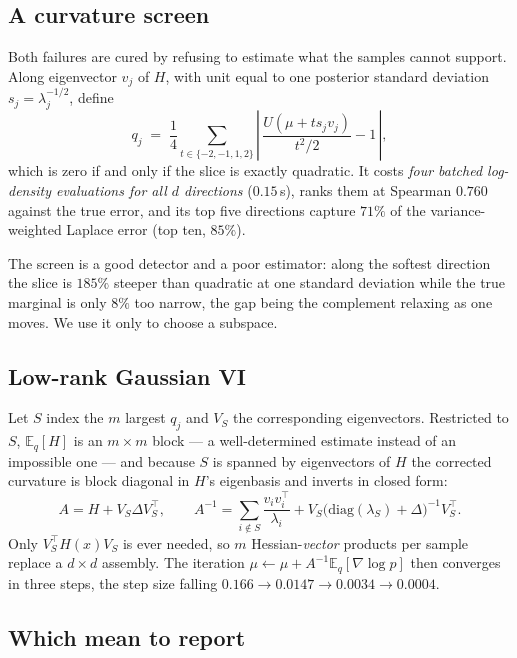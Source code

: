 \documentclass[11pt]{article}
\newcommand{\E}{\mathbb{E}}
\theoremstyle{plain}
\theoremstyle{definition}
\theoremstyle{remark}
\begin{document}
\subsection{A curvature screen}
\label{sec:screen}

Both failures are cured by refusing to estimate what the samples cannot support. Along eigenvector
$v_j$ of $H$, with unit equal to one posterior standard deviation $s_j = \lambda_j^{-1/2}$, define
\begin{equation}
\label{eq:screen}
  q_j \;=\; \frac14\sum_{t\in\{-2,-1,1,2\}}\left|\,\frac{U(\mu + t s_j v_j)}{t^2/2} - 1\,\right|,
\end{equation}
which is zero if and only if the slice is exactly quadratic. It costs \emph{four batched
log-density evaluations for all $d$ directions} ($0.15$\,s), ranks them at Spearman $0.760$ against
the true error, and its top five directions capture $71\%$ of the variance-weighted Laplace error
(top ten, $85\%$).

The screen is a good detector and a poor estimator: along the softest direction the slice is $185\%$
steeper than quadratic at one standard deviation while the true marginal is only $8\%$ too narrow,
the gap being the complement relaxing as one moves. We use it only to choose a subspace.

\subsection{Low-rank Gaussian VI}

Let $S$ index the $m$ largest $q_j$ and $V_S$ the corresponding eigenvectors. Restricted to $S$,
$\E_q[H]$ is an $m\times m$ block --- a well-determined estimate instead of an impossible one --- and
because $S$ is spanned by eigenvectors of $H$ the corrected curvature is block diagonal in $H$'s
eigenbasis and inverts in closed form:
\begin{equation}
\label{eq:woodbury}
  A = H + V_S\Delta V_S^\top,\qquad
  A^{-1} = \sum_{i\notin S}\frac{v_iv_i^\top}{\lambda_i} + V_S\big(\mathrm{diag}(\lambda_S)+\Delta\big)^{-1}V_S^\top .
\end{equation}
Only $V_S^\top H(x) V_S$ is ever needed, so $m$ Hessian-\emph{vector} products per sample replace a
$d\times d$ assembly. The iteration $\mu \leftarrow \mu + A^{-1}\E_q[\nabla\log p]$ then converges
in three steps, the step size falling $0.166 \to 0.0147 \to 0.0034 \to 0.0004$.

\subsection{Which mean to report}
\label{sec:estimator}
\end{document}
